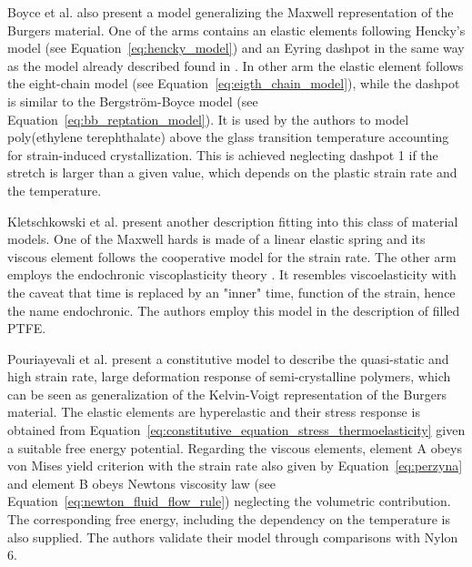 Boyce et al. \citep{boyceConstitutiveModelFinite2000} also present a model generalizing the Maxwell representation of the Burgers material.
One of the arms contains an elastic elements following Hencky's model (see Equation~\eqref{eq:hencky_model}) and an Eyring dashpot in the same way as the model already described found in \citep{boyceLargeInelasticDeformation1988}.
In other arm the elastic element follows the eight-chain model (see Equation~\eqref{eq:eigth_chain_model}), while the dashpot is similar to the Bergström-Boyce model (see Equation~\eqref{eq:bb_reptation_model}).
It is used by the authors to model poly(ethylene terephthalate) above the glass transition temperature accounting for strain-induced crystallization.
This is achieved neglecting dashpot 1 if the stretch is larger than a given value, which depends on the plastic strain rate and the temperature.

Kletschkowski et al. \citep{kletschkowskiEndochronicViscoplasticMaterial2002} present another description fitting into this class of material models.
One of the Maxwell hards is made of a linear elastic spring and its viscous element follows the cooperative model for the strain rate.
The other arm employs the endochronic viscoplasticity theory \citep{valanisTheoryViscoplasticityYield1970}.
It resembles viscoelasticity with the caveat that time is replaced by an "inner" time, function of the strain, hence the name endochronic.
The authors employ this model in the description of filled PTFE.

Pouriayevali et al. \citep{pouriayevaliConstitutiveDescriptionRatesensitive2013} present a constitutive model to describe the quasi-static and high strain rate, large deformation response of semi-crystalline polymers, which can be seen as generalization of the Kelvin-Voigt representation of the Burgers material.
The elastic elements are hyperelastic and their stress response is obtained from Equation~\eqref{eq:constitutive_equation_stress_thermoelasticity} given a suitable free energy potential.
Regarding the viscous elements, element A obeys von Mises yield criterion with the strain rate also given by Equation~\eqref{eq:perzyna} and element B obeys Newtons viscosity law (see Equation~\eqref{eq:newton_fluid_flow_rule}) neglecting the volumetric contribution.
The corresponding free energy, including the dependency on the temperature is also supplied.
The authors validate their model through comparisons with Nylon 6.

